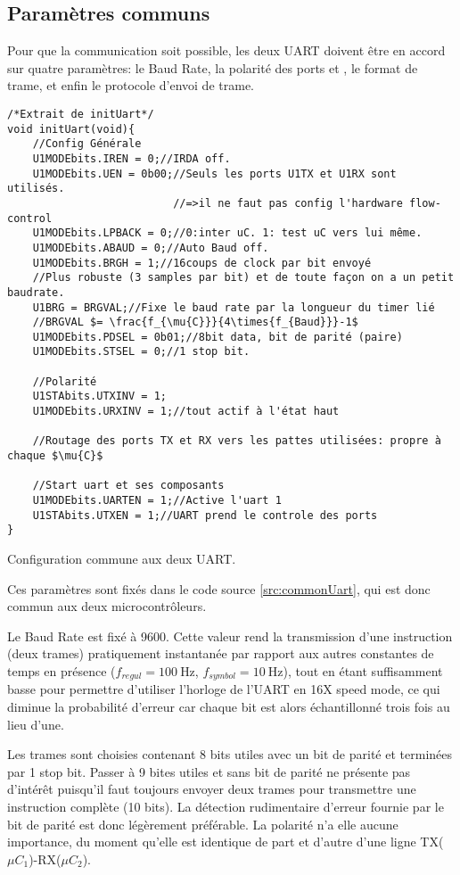 \subsection{Paramètres communs}
Pour que la communication soit possible, les deux UART doivent être en accord sur quatre paramètres: le Baud Rate, la polarité des ports  et , le format de trame, et enfin le protocole d'envoi de trame.
\begin{listing}[htbp]
\begin{verbatim}
/*Extrait de initUart*/
void initUart(void){
    //Config Générale
    U1MODEbits.IREN = 0;//IRDA off.
    U1MODEbits.UEN = 0b00;//Seuls les ports U1TX et U1RX sont utilisés.
                          //=>il ne faut pas config l'hardware flow-control
    U1MODEbits.LPBACK = 0;//0:inter uC. 1: test uC vers lui même.
    U1MODEbits.ABAUD = 0;//Auto Baud off.
    U1MODEbits.BRGH = 1;//16coups de clock par bit envoyé
    //Plus robuste (3 samples par bit) et de toute façon on a un petit baudrate.
    U1BRG = BRGVAL;//Fixe le baud rate par la longueur du timer lié
    //BRGVAL $= \frac{f_{\mu{C}}}{4\times{f_{Baud}}}-1$
    U1MODEbits.PDSEL = 0b01;//8bit data, bit de parité (paire)
    U1MODEbits.STSEL = 0;//1 stop bit.

    //Polarité
    U1STAbits.UTXINV = 1;
    U1MODEbits.URXINV = 1;//tout actif à l'état haut

    //Routage des ports TX et RX vers les pattes utilisées: propre à chaque $\mu{C}$

    //Start uart et ses composants
    U1MODEbits.UARTEN = 1;//Active l'uart 1
    U1STAbits.UTXEN = 1;//UART prend le controle des ports
}
\end{verbatim}
\caption{Configuration commune aux deux UART.\label{src:commonUart}}
\end{listing}
Ces paramètres sont fixés dans le code source \ref{src:commonUart}, qui est donc commun aux deux microcontrôleurs.

Le Baud Rate est fixé à \num{9600}. Cette valeur rend la transmission d'une instruction (deux trames) pratiquement instantanée par rapport aux autres constantes de temps en présence ($f_{regul} = \SI{100}{\hertz}$, $f_{symbol} = \SI{10}{\hertz}$), tout en étant suffisamment basse pour permettre d'utiliser l'horloge de l'UART en 16X speed mode, ce qui diminue la probabilité d'erreur car chaque bit est alors échantillonné trois fois au lieu d'une.

Les trames sont choisies contenant 8 bits utiles avec un bit de parité et terminées par 1 stop bit. Passer à 9 bites utiles et sans bit de parité ne présente pas d'intérêt puisqu'il faut toujours envoyer deux trames pour transmettre une instruction complète (10 bits). La détection rudimentaire d'erreur fournie par le bit de parité est donc légèrement préférable. La polarité n'a elle aucune importance, du moment qu'elle est identique de part et d'autre d'une ligne TX($\mu C_1$)-RX($\mu C_2$).

